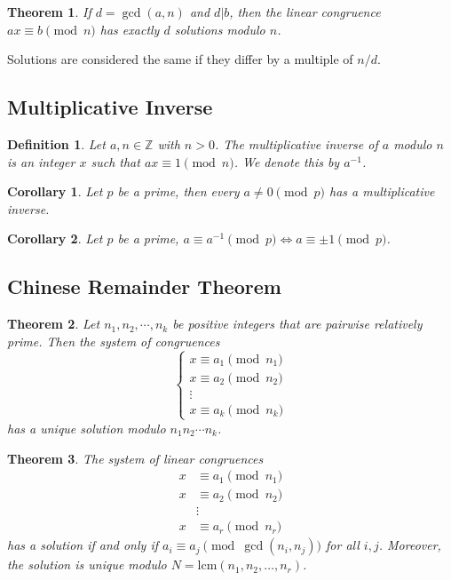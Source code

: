 \documentclass[letterpaper,12pt,oneside]{article}
\newtheorem{theorem}{Theorem}
\newtheorem{definition}{Definition}
\newtheorem*{corollary}{Corollary}
\begin{document}
\begin{theorem}
    If $d=\gcd(a,n)$ and $d|b$, then the linear congruence $ax\equiv b\pmod{n}$ has exactly $d$ solutions modulo $n$.
\end{theorem}

Solutions are considered the same if they differ by a multiple of $n/d$. 
\subsection{Multiplicative Inverse}
\begin{definition}
    Let $a,n\in \mathbb{Z}$ with $n>0$. The multiplicative inverse of $a$ modulo $n$ is an integer $x$ such that $ax\equiv 1\pmod{n}$. We denote this by $a^{-1}$.
\end{definition}
\begin{corollary}
    Let $p$ be a prime, then every $a\neq 0 \pmod{p}$ has a multiplicative inverse.
\end{corollary}
\begin{corollary}
    Let $p$ be a prime, $a\equiv a^{-1}\pmod{p} \iff a\equiv \pm 1\pmod{p}$.
\end{corollary}
\subsection{Chinese Remainder Theorem}
\begin{theorem}
    Let $n_1,n_2,\cdots,n_k$ be positive integers that are pairwise relatively prime. Then the system of congruences\[
        \begin{cases}
            x\equiv a_1\pmod{n_1}\\
            x\equiv a_2\pmod{n_2}\\
            \vdots\\
            x\equiv a_k\pmod{n_k}
        \end{cases}
    \]
    has a unique solution modulo $n_1n_2\cdots n_k$.
\end{theorem}
\begin{theorem}
    The system of linear congruences \begin{align*}
        x & \equiv a_1 \pmod {n_1} \\
        x & \equiv a_2 \pmod {n_2} \\
          & \vdots                 \\
        x & \equiv a_r \pmod {n_r}
    \end{align*}
    has a solution if and only if $a_i\equiv a_j \pmod {\gcd(n_i,n_j)}$ for all $i,j$. Moreover, the solution is unique modulo $N=\text{lcm}(n_1,n_2,\ldots,n_r)$.
\end{theorem}
\end{document}
